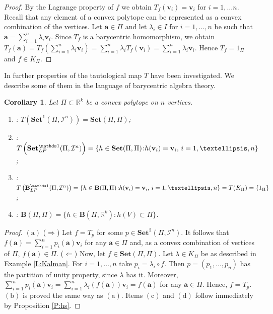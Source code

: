 \documentclass[12pt]{amsart}
\theoremstyle{plain}
\newtheorem{corollary}[theorem]{Corollary}
\theoremstyle{definition}
\numberwithin{equation}{section}
\begin{document}
\begin{proof}
By the Lagrange property of $f$ we obtain $T_f(\mathbf{v}_i)=\mathbf{v}_i$ for $i=1,\ldots n$. Recall that any element of a convex polytope can be represented as a convex combination of the vertices. Let $\mathbf{a}\in\Pi$ and let $\lambda_i\in I$ for $i=1,\ldots ,n$ be such that $\mathbf{a}=\sum_{i=1}^n\lambda_i\mathbf{v}_i$. Since $T_f$ is a barycentric homomorphism, we obtain $T_f(\mathbf{a})=T_f(\sum_{i=1}^n\lambda_i\mathbf{v}_i)=\sum_{i=1}^n\lambda_iT_f(\mathbf{v}_i)=\sum_{i=1}^n\lambda_i\mathbf{v}_i$. Hence $T_f=1_\Pi$ and $f\in K_\Pi$.
\end{proof}

In \cite[Section 3]{G} further properties of the tautological map $T$ have been investigated. We describe some of them in the language of bary\-centric algebra theory.
\begin{corollary}
Let $\Pi\subset \mathbb{R}^k$ be a convex polytope on $n$ vertices.
\begin{enumerate}
\item[$(\mathrm a)$] \cite[Theorem 3.2]{G}: $T\left(\mathbf{Set}^{\mathds 1}(\Pi,\mathcal{I}^n)\right)=\mathbf{Set}(\Pi,\Pi)$;
\item[$(\mathrm b)$] \cite[Theorem 3.4 (i)-(ii)]{G}: $T\left(\mathbf{Set}_{LP}^{\mathds 1}(\Pi,\mathcal{I}^n)\right)=\{h\in\mathbf{Set}(\Pi,\Pi)\colon\\ h(\mathbf{v}_i)=\mathbf{v}_i,\, i=1,\ldots ,n\}$;
\item[$(\mathrm c)$] \cite[Theorem 3.4 (iii)-(iv)]{G}: $T\left(\mathbf{B}_{LP}^{\mathds 1}(\Pi,\mathcal{I}^n)\right)=\{h\in\mathbf{B}(\Pi,\Pi)\colon\\ h(\mathbf{v}_i)=\mathbf{v}_i,\, i=1,\ldots ,n\}=T(K_\Pi)=\{1_\Pi\}$;
\item[$(\mathrm d)$] \cite[Proposition 3.5]{G}: $\mathbf{B}(\Pi,\Pi)=\{h\in\mathbf{B}(\Pi,\mathbb{R}^k)\colon h(V)\subset\Pi\}$.
\end{enumerate}
\end{corollary}
\begin{proof}
$(\mathrm a)$ ($\Rightarrow$) Let $f=T_p$ for some $p\in\mathbf{Set}^{\mathds 1}(\Pi,\mathcal{I}^n)$. It follows that $f(\mathbf a)=\sum_{i=1}^np_i(\mathbf a)\mathbf v_i$ for any $\mathbf a\in\Pi$ and, as a convex combination of vertices of $\Pi$, $f(\mathbf a)\in\Pi$.\vskip2pt
($\Leftarrow$) Now, let $f\in\mathbf{Set}(\Pi,\Pi)$. Let $\lambda\in K_\Pi$ be as described in Example \ref{L:Kalman}. For $i=1,\ldots ,n$ take $p_i=\lambda_i\circ f$. Then $p=(p_1,\ldots, p_n)$ has the partition of unity property, since $\lambda$ has it. Moreover, $\sum_{i=1}^np_i(\mathbf a)\mathbf v_i= \sum_{i=1}^n \lambda_i(f(\mathbf a))\mathbf v_i=f(\mathbf a)$ for any $\mathbf a\in\Pi$. Hence, $f=T_p$.\vskip2pt
$(\mathrm b)$ is proved the same way as $(\mathrm a)$. \vskip2pt
Items $(\mathrm c)$ and $(\mathrm d)$ follow immediately by Proposition \ref{P:hs}.
\end{proof}
\end{document}
